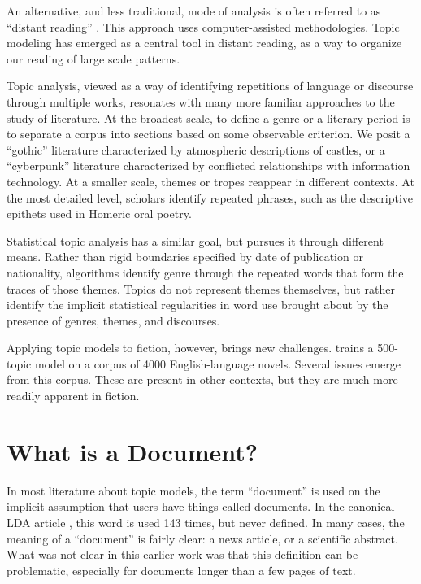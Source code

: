 An alternative, and less traditional, mode of analysis is often referred to as ``distant reading'' \citep{moretti-13}.   This approach uses computer-assisted methodologies. Topic modeling has emerged as a central tool in distant reading, as a way to organize our reading of large scale patterns.

Topic analysis, viewed as a way of identifying repetitions of language or discourse through multiple works, resonates with many more familiar approaches to the study of literature.
At the broadest scale, to define a genre or a literary period is to separate a corpus into sections based on some observable criterion.
We posit a ``gothic'' literature characterized by atmospheric descriptions of castles, or a ``cyberpunk'' literature characterized by conflicted relationships with information technology.
At a smaller scale, themes or tropes reappear in different contexts.
At the most detailed level, scholars identify repeated phrases, such as the descriptive epithets used in Homeric oral poetry.

Statistical topic analysis has a similar goal, but pursues it through different means.
Rather than rigid boundaries specified by date of publication or nationality, algorithms identify genre through the repeated words that form the traces of those themes.
Topics do not represent themes themselves, but rather identify the implicit statistical regularities in word use brought about by the presence of genres, themes, and discourses.


Applying topic models to fiction, however, brings new challenges.  \cite{jockers-13} trains a 500-topic model on a corpus of 4000 English-language novels.
Several issues emerge from this corpus. These are present in other contexts, but they are much more readily apparent in fiction.

\section{What is a Document?}

In most literature about topic models, the term ``document'' is used on the implicit assumption that users have things called documents.
In the canonical LDA article \cite{blei-03}, this word is used 143 times, but never defined.
In many cases, the meaning of a ``document'' is fairly clear: a news article, or a scientific abstract.
What was not clear in this earlier work was that this definition can be problematic, especially for documents longer than a few pages of text.

